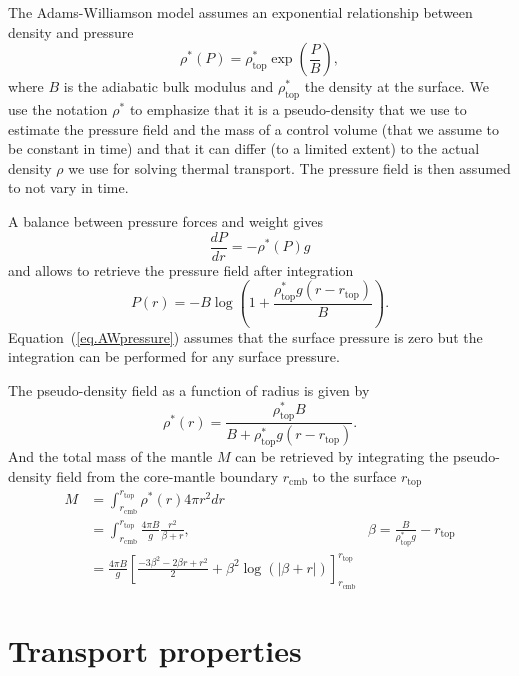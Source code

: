 \documentclass{article}
\begin{document}
The Adams-Williamson model assumes an exponential relationship between density and pressure
\begin{equation}
    \rho^*(P) = \rho^*_\mathrm{top} \exp\left( \frac{P}{B}\right),
\end{equation}
where $B$ is the adiabatic bulk modulus and $\rho_\mathrm{top}^*$ the density at the surface. We use the notation $\rho^*$ to emphasize that it is a pseudo-density that we use to estimate the pressure field and the  mass of a control volume (that we assume to be constant in time) and that it can differ (to a limited extent) to the actual density $\rho$ we use for solving thermal transport. The pressure field is then assumed to not vary in time.

A balance between pressure forces and weight gives
\begin{equation}
    \frac{dP}{dr} = -\rho^*(P) g
\end{equation}
and allows to retrieve the pressure field after integration
\begin{equation}
    P(r) = -B \log\left(1+\frac{\rho^*_\mathrm{top} g(r-r_\mathrm{top})}{B} \right).
    \label{eq.AWpressure}
\end{equation}
Equation~(\ref{eq.AWpressure}) assumes that the surface pressure is zero but the integration can be performed for any surface pressure.

The pseudo-density field as a function of radius is given by
\begin{equation}
    \rho^*(r) = \frac{\rho_\mathrm{top}^* B}{B+ \rho_\mathrm{top}^*g(r-r_\mathrm{top})}.
\end{equation}
And the total mass of the mantle $M$ can be retrieved by integrating the pseudo-density field from the core-mantle boundary $r_\mathrm{cmb}$ to the surface $r_\mathrm{top}$
\begin{align}
    M &= \int^{r_\mathrm{top}}_{r_\mathrm{cmb}} \rho^*(r) 4\pi r^2 dr\\
      &= \int^{r_\mathrm{top}}_{r_\mathrm{cmb}} \frac{4\pi B}{g}\frac{r^2}{\beta+r}, & \beta=\frac{B}{\rho^*_\mathrm{top}g}-r_\mathrm{top}\\
      &= \frac{4\pi B}{g} \left[ \frac{-3\beta^2 - 2\beta r +r^2}{2}+\beta^2\log(\left| \beta+r\right|) \right]^{r_\mathrm{top}}_{r_\mathrm{cmb}}
\end{align}



\section{Transport properties}
\end{document}
